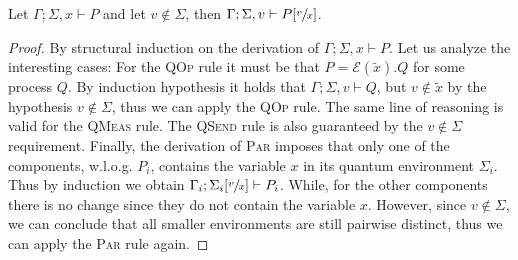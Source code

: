 \begin{theorem}
  Let $\Gamma; \Sigma, x \vdash P$ and let $v \not\in \Sigma$, then $\Gamma; \Sigma, v \vdash P[\sfrac{v}{x}]$.
\end{theorem}
\begin{proof}
  By structural induction on the derivation of $\Gamma; \Sigma, x \vdash P$.
  Let us analyze the interesting cases: For the \textsc{QOp} rule it must be that $P = \mathcal{E}(\widetilde{x}).Q$ for some process $Q$.
  By induction hypothesis it holds that $\Gamma; \Sigma, v \vdash Q$, but $v \not\in \widetilde{x}$ by the hypothesis $v \not\in \Sigma$, thus we can apply the \textsc{QOp} rule.
  The same line of reasoning is valid for the \textsc{QMeas} rule.
  The \textsc{QSend} rule is also guaranteed by the $v \not\in \Sigma$ requirement.
  Finally, the derivation of \textsc{Par} imposes that only one of the components, w.l.o.g. $P_i$, contains the variable $x$ in its quantum environment $\Sigma_i$.
  Thus by induction we obtain $\Gamma_i; \Sigma_i[\sfrac{v}{x}] \vdash P_i$. While, for the other components there is no change since they do not contain the variable $x$.
  However, since $v \not\in \Sigma$, we can conclude that all smaller environments are still pairwise distinct, thus we can apply the \textsc{Par} rule again.
\end{proof}

